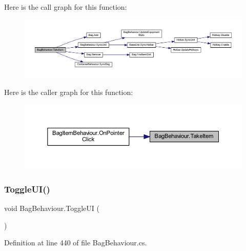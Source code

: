 Here is the call graph for this function\+:
\nopagebreak
\begin{figure}[H]
\begin{center}
\leavevmode
\includegraphics[width=350pt]{class_bag_behaviour_a0cde4989737c537ca94730cc690d6780_cgraph}
\end{center}
\end{figure}
Here is the caller graph for this function\+:
\nopagebreak
\begin{figure}[H]
\begin{center}
\leavevmode
\includegraphics[width=350pt]{class_bag_behaviour_a0cde4989737c537ca94730cc690d6780_icgraph}
\end{center}
\end{figure}
\mbox{\label{class_bag_behaviour_a830725c05ecdc1a1a637d26cf5cff0dc}} 
\subsubsection{\texorpdfstring{ToggleUI()}{ToggleUI()}}
{\footnotesize\ttfamily void Bag\+Behaviour.\+Toggle\+UI (\begin{DoxyParamCaption}{ }\end{DoxyParamCaption})}



Definition at line 440 of file Bag\+Behaviour.\+cs.

